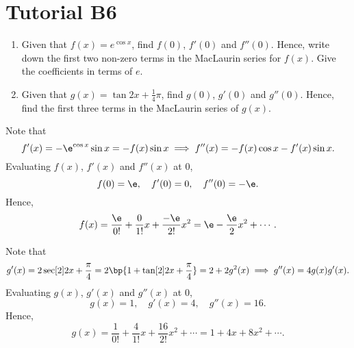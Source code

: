 \section{Tutorial B6}

\begin{problem}
    \begin{enumerate}
        \item Given that $f(x) = e^{\cos x}$, find $f(0)$, $f'(0)$ and $f''(0)$. Hence, write down the first two non-zero terms in the MacLaurin series for $f(x)$. Give the coefficients in terms of $e$.
        \item Given that $g(x) = \tan{2x + \frac14 \pi }$, find $g(0)$, $g'(0)$ and $g''(0)$. Hence, find the first three terms in the MacLaurin series of $g(x)$.
    \end{enumerate}
\end{problem}
\begin{solution}
    \begin{ppart}
        Note that \[f'(x) = -\e^{\cos x} \sin x  = -f(x) \sin x \implies f''(x) = -f(x) \cos x  -f'(x) \sin x .\] Evaluating $f(x)$, $f'(x)$ and $f''(x)$ at 0, \[f(0) = \e, \quad f'(0) = 0, \quad f''(0) = -\e.\] Hence, \[f(x) = \frac{\e}{0!} + \frac{0}{1!} x + \frac{-\e}{2!} x^2 = \e - \frac{\e}{2}x^2 + \cdots.\]
    \end{ppart}
    \begin{ppart}
        Note that \[g'(x) = 2\sec[2]{2x + \frac\pi4} = 2\bp{1 + \tan[2]{2x + \frac\pi4}} = 2 + 2g^2(x) \implies g''(x) = 4g(x)g'(x).\] Evaluating $g(x)$, $g'(x)$ and $g''(x)$ at 0, \[g(x) = 1, \quad g'(x) = 4, \quad g''(x) = 16.\] Hence, \[g(x) = \frac{1}{0!} + \frac{4}{1!} x + \frac{16}{2!} x^2 + \cdots = 1 + 4x + 8x^2 + \cdots.\]
    \end{ppart}
\end{solution}

